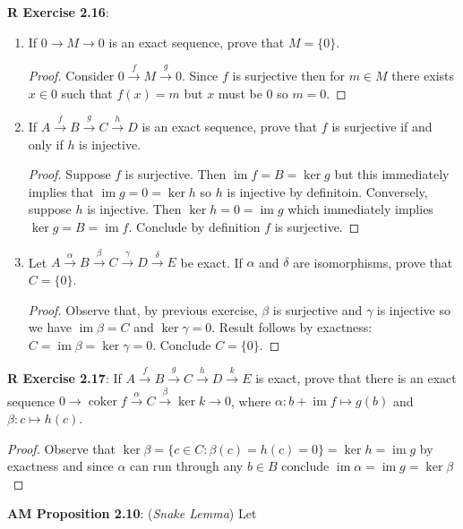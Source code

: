 \documentclass[8pt]{amsart}
\theoremstyle{plain}%
\theoremstyle{definition}
\theoremstyle{remark}
\numberwithin{equation}{section}
\newcommand{\im}{\operatorname{im}}
\newcommand{\coker}{\operatorname{coker}}
\begin{document}
\textbf{R Exercise 2.16}:
	\begin{enumerate}
		\item If $0 \rightarrow M \rightarrow 0$ is an exact sequence, prove that $M = \{0\}$.
			\begin{proof}
				Consider $0 \xrightarrow f M \xrightarrow g 0$. Since $f$ is surjective then for $m \in M$ there exists $x \in 0$ such that $f(x) = m$ but $x$ must be $0$ so $m = 0$.
			\end{proof}
		\item If $A \xrightarrow f B \xrightarrow g C \xrightarrow h D$ is an exact sequence, prove that $f$ is surjective if and only if $h$ is injective.
			\begin{proof}
				Suppose $f$ is surjective. Then $\im f = B = \ker g$ but this immediately implies that $\im g = 0 = \ker h$ so $h$ is injective by definitoin. Conversely, suppose $h$ is injective. Then $\ker h = 0 = \im g$ which immediately implies $\ker g = B = \im f$. Conclude by definition $f$ is surjective.
			\end{proof}
		\item Let $A \xrightarrow \alpha B \xrightarrow \beta C \xrightarrow \gamma D \xrightarrow \delta E$ be exact. If $\alpha$ and $\delta$ are isomorphisms, prove that $C = \{0\}$.
			\begin{proof}
				Observe that, by previous exercise, $\beta$ is surjective and $\gamma$ is injective so we have $\im \beta = C$ and $\ker \gamma = 0$. Result follows by exactness: $C = \im \beta = \ker \gamma = 0$. Conclude $C = \{0\}$.
			\end{proof}
	\end{enumerate}

\textbf{R Exercise 2.17}: If $A \xrightarrow f B \xrightarrow g C \xrightarrow h D \xrightarrow k E$ is exact, prove that there is an exact sequence $0 \rightarrow \coker f \xrightarrow \alpha C \xrightarrow \beta \ker k \rightarrow 0$, where $\alpha : b + \im f \mapsto g(b)$ and $\beta : c \mapsto h(c)$.
	\begin{proof}
		Observe that $\ker \beta = \{c \in C : \beta(c) = h(c) = 0\} = \ker h = \im g$ by exactness and since $\alpha$ can run through any $b \in B$ conclude $\im \alpha = \im g = \ker \beta$
	\end{proof}

\textbf{AM Proposition 2.10}: (\textit{Snake Lemma}) Let
\end{document}
